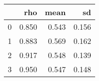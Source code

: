 \begin{tabular}{lrrr}
\toprule
{} &    rho &   mean &     sd \\
\midrule
0 &  0.850 &  0.543 &  0.156 \\
1 &  0.883 &  0.569 &  0.162 \\
2 &  0.917 &  0.548 &  0.139 \\
3 &  0.950 &  0.547 &  0.148 \\
\bottomrule
\end{tabular}
